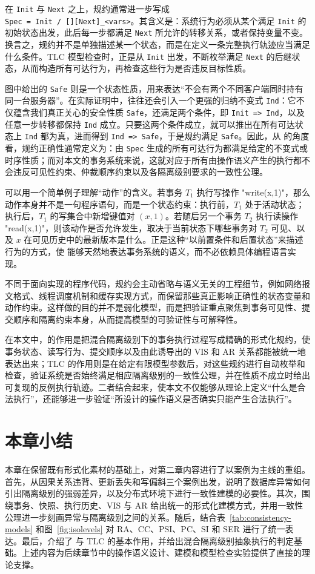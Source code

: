 在 \texttt{Init} 与 \texttt{Next} 之上，规约通常进一步写成\\ \texttt{Spec = Init /\ [][Next]\_<vars>}。其含义是：系统行为必须从某个满足 \texttt{Init} 的初始状态出发，此后每一步都满足 \texttt{Next} 所允许的转移关系，或者保持变量不变。换言之，规约并不是单独描述某一个状态，而是在定义一条完整执行轨迹应当满足什么条件。TLC 模型检查时，正是从 \texttt{Init} 出发，不断枚举满足 \texttt{Next} 的后继状态，从而构造所有可达行为，再检查这些行为是否违反目标性质。

图中给出的 \texttt{Safe} 则是一个状态性质，用来表达“不会有两个不同客户端同时持有同一台服务器”。在实际证明中，往往还会引入一个更强的归纳不变式 \texttt{Ind}：它不仅蕴含我们真正关心的安全性质 \texttt{Safe}，还满足两个条件，即 \texttt{Init => Ind}，以及任意一步转移都保持 \texttt{Ind} 成立。只要这两个条件成立，就可以推出在所有可达状态上 \texttt{Ind} 都为真，进而得到 \texttt{Ind => Safe}，于是规约满足 \texttt{Safe}。因此，从 \TLAPlus 的角度看，规约正确性通常定义为：由 \texttt{Spec} 生成的所有可达行为都满足给定的不变式或时序性质；而对本文的事务系统来说，这就对应于所有由操作语义产生的执行都不会违反可见性约束、仲裁顺序约束以及各隔离级别要求的一致性公理。

可以用一个简单例子理解“动作”的含义。若事务 $T_1$ 执行写操作 "write(x,1)"，那么动作本身并不是一句程序语句，而是一个状态约束：执行前，$T_1$ 处于活动状态；执行后，$T_1$ 的写集合中新增键值对 $(x,1)$。若随后另一个事务 $T_2$ 执行读操作 "read(x,1)"，则该动作是否允许发生，取决于当前状态下哪些事务对 $T_2$ 可见、以及 $x$ 在可见历史中的最新版本是什么。正是这种“以前置条件和后置状态”来描述行为的方式，使 \TLAPlus 能够天然地表达事务系统的语义，而不必依赖具体编程语言实现。

不同于面向实现的程序代码，\TLAPlus 规约会主动省略与语义无关的工程细节，例如网络报文格式、线程调度机制和缓存实现方式，而保留那些真正影响正确性的状态变量和动作约束。这样做的目的并不是弱化模型，而是把验证重点聚焦到事务可见性、提交顺序和隔离约束本身，从而提高模型的可验证性与可解释性。

在本文中，\TLAPlus 的作用是把混合隔离级别下的事务执行过程写成精确的形式化规约，使事务状态、读写行为、提交顺序以及由此诱导出的 $\text{VIS}$ 和 $\text{AR}$ 关系都能被统一地表达出来；TLC 的作用则是在给定有限模型参数后，对这些规约进行自动枚举和检查，验证系统是否始终满足相应隔离级别的一致性公理，并在性质不成立时给出可复现的反例执行轨迹。二者结合起来，使本文不仅能够从理论上定义“什么是合法执行”，还能够进一步验证“所设计的操作语义是否确实只能产生合法执行”。

\section{本章小结}
本章在保留既有形式化素材的基础上，对第二章内容进行了以案例为主线的重组。首先，从因果关系违背、更新丢失和写偏斜三个案例出发，说明了数据库异常如何引出隔离级别的强弱差异，以及分布式环境下进行一致性建模的必要性。其次，围绕事务、快照、执行历史、$\text{VIS}$ 与 $\text{AR}$ 给出统一的形式化建模方式，并用一致性公理进一步刻画异常与隔离级别之间的关系。随后，结合表~\ref{tab:consistency-models} 和图~\ref{fig:isolevels} 对 RA、CC、PSI、PC、SI 和 SER 进行了统一表达。最后，介绍了 \TLAPlus 与 TLC 的基本作用，并给出混合隔离级别抽象执行的判定基础。上述内容为后续章节中的操作语义设计、\TLAPlus 建模和模型检查实验提供了直接的理论支撑。
